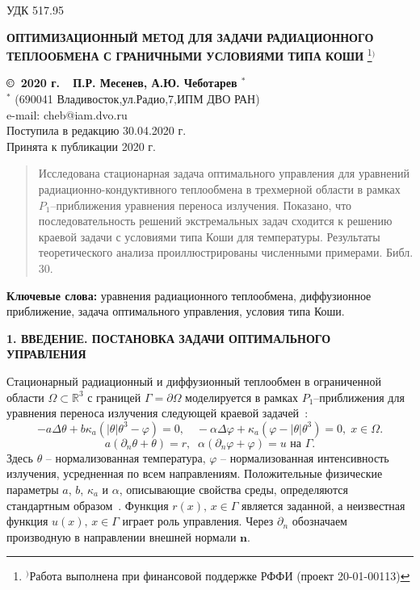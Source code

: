 \documentclass[12pt]{article}
\begin{document}
    УДК 517.95
    \begin{center}
    {\bf ОПТИМИЗАЦИОННЫЙ МЕТОД ДЛЯ ЗАДАЧИ РАДИАЦИОННОГО ТЕПЛООБМЕНА С ГРАНИЧНЫМИ УСЛОВИЯМИ ТИПА КОШИ}
        \footnote[{1}]{$^)$Работа выполнена при финансовой поддержке РФФИ (проект 20-01-00113)}$^)$
    \end{center}
    \begin{center}
    {\bf \copyright\  2020 г.\ \  П.Р. Месенев, А.Ю. Чеботарев $^{*}$}
        \\
        {\textit{$^{*}$} (690041 Владивосток,ул.Радио,7,ИПМ ДВО РАН)\\
            e-mail:  cheb@iam.dvo.ru}\\
        {\small  Поступила в редакцию 30.04.2020 г.\\
            Принята к публикации 2020 г.}
    \end{center}

    \sloppy
    \begin{quote}
        \small
        Исследована стационарная задача оптимального управления для уравнений
        радиационно-кондуктивного теплообмена в трехмерной
        области в рамках $P_1$--приближения уравнения переноса излучения.
        Показано, что последовательность решений экстремальных задач
        сходится к решению краевой задачи с условиями типа Коши для температуры.
        Результаты теоретического анализа проиллюстрированы численными примерами.
        Библ.
        30.
    \end{quote}
    {\bf Ключевые слова:} уравнения радиационного теплообмена, диффузионное
    приближение, задача оптимального управления, условия типа Коши.

    \begin{center}
        \textbf{1. ВВЕДЕНИЕ.
        ПОСТАНОВКА ЗАДАЧИ ОПТИМАЛЬНОГО УПРАВЛЕНИЯ}
    \end{center}

    Стационарный радиационный и диффузионный теплообмен в
    ограниченной области $\Omega\subset \mathbb{R}^3$ с границей
    $\Gamma=\partial\Omega$ моделируется в рамках $P_1$--приближения для уравнения
    переноса излучения следующей
    краевой задачей~\cite{Modest,Kovt}:
    \begin{equation}
        \label{eq1}
        - a\Delta\theta + b\kappa_a(|\theta|\theta^3- \varphi)=0,   \quad
        -\alpha \Delta \varphi + \kappa_a(\varphi-|\theta|\theta^3)=0,\; x\in\Omega.
    \end{equation}
    \begin{equation}
        \label{bc1}
        a(\partial_n\theta+\theta) = r,\;\;
        \alpha(\partial_n\varphi+\varphi) = u \text{  на  }\Gamma.
    \end{equation}
    Здесь $\theta$ -- нормализованная температура, $\varphi$ --
    нормализованная интенсивность излучения, усредненная по всем направлениям.
    Положительные физические параметры $a$, $b$, $\kappa_a$ и $\alpha$, описывающие
    свойства среды, определяются стандартным образом~\cite{Kovt}.
    Функция $r(x),\, x\in\Gamma$ является заданной, а неизвестная функция $u(x),\, x\in\Gamma$
    играет роль управления.
    Через $\partial_n$ обозначаем производную в направлении внешней нормали $\mathbf n$.
\end{document}
